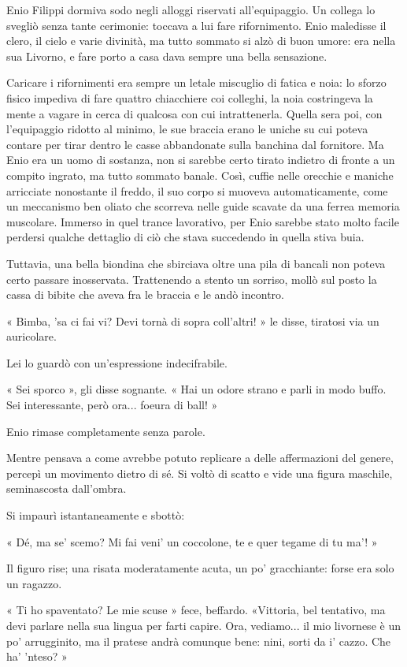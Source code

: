 Enio Filippi dormiva sodo negli alloggi riservati all'equipaggio. Un collega lo svegliò senza tante cerimonie: toccava a lui fare rifornimento. Enio maledisse il clero, il cielo e varie divinità, ma tutto sommato si alzò di buon umore: era nella sua Livorno, e fare porto a casa dava sempre una bella sensazione.

Caricare i rifornimenti era sempre un letale miscuglio di fatica e noia: lo sforzo fisico impediva di fare quattro chiacchiere coi colleghi, la noia costringeva la mente a vagare in cerca di qualcosa con cui intrattenerla. Quella sera poi, con l'equipaggio ridotto al minimo, le sue braccia erano le uniche su cui poteva contare per tirar dentro le casse abbandonate sulla banchina dal fornitore. Ma Enio era un uomo di sostanza, non si sarebbe certo tirato indietro di fronte a un compito ingrato, ma tutto sommato banale. Così, cuffie nelle orecchie e maniche arricciate nonostante il freddo, il suo corpo si muoveva automaticamente, come un meccanismo ben oliato che scorreva nelle guide scavate da una ferrea memoria muscolare. Immerso in quel trance lavorativo, per Enio sarebbe stato molto facile perdersi qualche dettaglio di ciò che stava succedendo in quella stiva buia.

Tuttavia, una bella biondina che sbirciava oltre una pila di bancali non poteva certo passare inosservata. Trattenendo a stento un sorriso, mollò sul posto la cassa di bibite che aveva fra le braccia e le andò incontro.

« Bimba, 'sa ci fai vi? Devi tornà di sopra coll'altri! » le disse, tiratosi via un auricolare.

Lei lo guardò con un'espressione indecifrabile.

« Sei sporco », gli disse sognante. « Hai un odore strano e parli in modo buffo. Sei interessante, però ora... foeura di ball! »

Enio rimase completamente senza parole.

Mentre pensava a come avrebbe potuto replicare a delle affermazioni del genere, percepì un movimento dietro di sé. Si voltò di scatto e vide una figura maschile, seminascosta dall'ombra.

Si impaurì istantaneamente e sbottò:

« Dé, ma se' scemo? Mi fai veni' un coccolone, te e quer tegame di tu ma'! »

Il figuro rise; una risata moderatamente acuta, un po' gracchiante: forse era solo un ragazzo.

« Ti ho spaventato? Le mie scuse » fece, beffardo. «Vittoria, bel tentativo, ma devi parlare nella sua lingua per farti capire. Ora, vediamo... il mio livornese è un po' arrugginito, ma il pratese andrà comunque bene: nini, sorti da i' cazzo. Che ha' 'nteso? »

